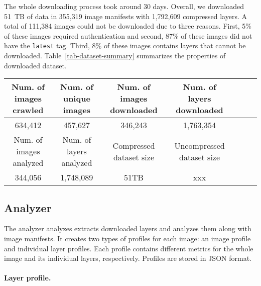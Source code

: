 The whole downloading process took around 30 days.
%
Overall, we downloaded 51~TB of data in 355,319 image manifests with 1,792,609
compressed layers.
%
A total of 111,384 images could not be downloaded due to three reasons.
%
First, 5\% of these images required authentication and
second, 87\% of these images did not have the \texttt{latest} tag.
Third, 8\% of these images contains layers that cannot be downloaded.
Table~\ref{tab-dataset-summary} summarizes the properties of downloaded
dataset.

\begin{table*}
	\centering
	\caption{Dataset summary} \label{tab-dataset-summary}
	\begin{tabular}{c|c|c|c|c|c|c}%
		\hline
		Num. of images crawled & Num. of unique images    & Num. of images downloaded  & Num. of layers downloaded \\
		\hline
		634,412                 & 457,627                 & 346,243                    & 1,763,354  \\
		\hline
		Num. of images analyzed & Num. of layers analyzed & Compressed dataset size              &  Uncompressed dataset size \\
		\hline
		344,056                     & 1,748,089                     & 51TB                        & xxx  \\
		\hline
	\end{tabular}
\end{table*}

\subsection{Analyzer}
\label{sec:analyzer}

The analyzer analyzes extracts downloaded layers
and analyzes them along with image manifests.
It creates two types of profiles for each image:
an image profile and individual layer profiles.
Each profile contains different metrics for the whole image and
its individual layers, respectively.
Profiles are stored in JSON format.

\paragraph{Layer profile.}

